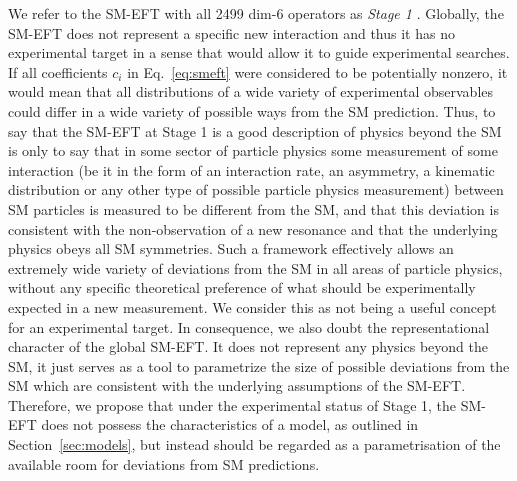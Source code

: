 We refer to the SM-EFT with all 2499 dim-6 operators as \emph{Stage 1} .
Globally, the SM-EFT does not represent a specific new interaction
and thus it has no experimental target in a sense that would allow it to
guide experimental searches.  If all coefficients 
$c_i$ in Eq.~\ref{eq:smeft}
were considered to be potentially nonzero, it would mean that all
distributions of a wide variety of experimental observables could
differ in a wide variety of possible ways from the SM prediction.
Thus, to say that the SM-EFT at Stage 1 is a
good description of physics beyond the SM is only to say that in some
sector of particle physics some measurement of some interaction (be it
in the form of an interaction rate, an asymmetry, a kinematic
distribution or any other type of possible particle physics
measurement) between SM particles is measured to be different from
the SM, and that this deviation is consistent with the non-observation
of a new resonance and that the underlying physics obeys all SM
symmetries. 
Such a framework effectively allows an extremely wide variety
of deviations from the SM in all areas of particle physics, without
any specific theoretical preference of what should be experimentally
expected in a new measurement. We consider this as not being a
useful concept for an experimental target. In consequence, we also doubt the
representational character of the global SM-EFT. It does not represent any physics beyond the SM, it just serves as a tool to
parametrize the size of possible deviations from the SM which are
consistent with the underlying assumptions of the SM-EFT. Therefore,
we propose that under the experimental status of Stage 1, the SM-EFT does
not possess the characteristics of a model, as outlined in
Section~\ref{sec:models}, but instead should be regarded as a
parametrisation of the available room for deviations from SM
predictions.

